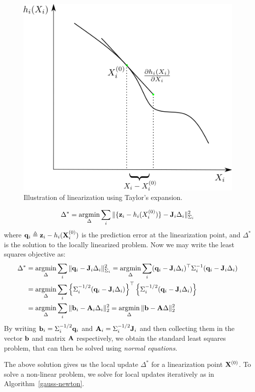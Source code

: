 \begin{figure}[htpb]
    \centering
    \includegraphics[width=0.5\linewidth]{figs/linearization}
    \caption{Illustration of linearization using Taylor's expansion.}
    \label{fig:taylor}
    \vspace{-1em}
\end{figure}
\begin{align}
    \Delta^* = \operatorname*{\arg\!\min}_{\Delta}\sum_{i} \| \{\mathbf{z}_i - h_i(X_i^{(0)})\} - \mathbf{J}_i \Delta_i \|_{\Sigma_i}^2
\end{align}
where $\mathbf{q}_i \triangleq \mathbf{z}_i - h_i(\mathbf{X}_i^{(0)})$ is the prediction error at the linearization point, and $\Delta^*$ is the solution to the locally linearized problem. Now we may write the least squares objective as:
\begin{align}
    \Delta^* &= \operatorname*{\arg\!\min}_{\Delta}\sum_{i} \| \mathbf{q}_i - \mathbf{J}_i \Delta_i \|_{\Sigma_i}^2 = \operatorname*{\arg\!\min}_{\Delta}\sum_{i} (\mathbf{q}_i - \mathbf{J}_i \Delta_i)^\top \Sigma_i^{-1} (\mathbf{q}_i - \mathbf{J}_i \Delta_i)\\
             &=  \operatorname*{\arg\!\min}_{\Delta}\sum_{i} \left\{\Sigma_i^{-1/2}(\mathbf{q}_i - \mathbf{J}_i \Delta_i)\right\}^\top \left\{ \Sigma_i^{-1/2} (\mathbf{q}_i - \mathbf{J}_i \Delta_i)\right\}\\
             &= \operatorname*{\arg\!\min}_{\Delta}\sum_{i} \| \mathbf{b}_i - \mathbf{A}_i \Delta_i \|_2^2 = \operatorname*{\arg\!\min}_{\Delta} \| \mathbf{b} - \mathbf{A} \Delta\|_2^2
\end{align}
By writing $\mathbf{b}_i = \Sigma_i^{-1/2} \mathbf{q}_i$ and $\mathbf{A}_i = \Sigma_i^{-1/2} \mathbf{J}_i$ and then collecting them in the vector $\mathbf{b}$ and matrix $\mathbf{A}$ respectively, we obtain the standard least squares problem, that can then be solved using \emph{normal equations}.

The above solution gives us the local update $\Delta^*$ for a linearization point $\mathbf{X}^{(0)}$. To solve a non-linear problem, we solve for local updates iteratively as in Algorithm~\ref{gauss-newton}.



